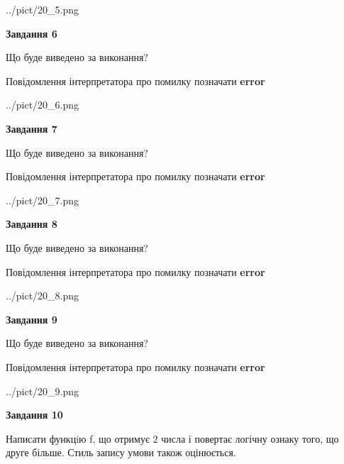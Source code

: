 \documentclass[12pt, ukrainian]{article}
\begin{document}
{\begin {large}
\begin{center}
	{../pict/20_5.png}
\end{center}
\newpage

{\begin {center}\textbf{Завдання 6}\end {center}}\par
Що буде виведено за виконання? \par
Повідомлення інтерпретатора про помилку позначати \textbf{error}

\begin{center}
	{../pict/20_6.png}
\end{center}
\newpage

{\begin {center}\textbf{Завдання 7}\end {center}}\par
Що буде виведено за виконання? \par
Повідомлення інтерпретатора про помилку позначати \textbf{error}

\begin{center}
	{../pict/20_7.png}
\end{center}
\newpage

{\begin {center}\textbf{Завдання 8}\end {center}}\par
Що буде виведено за виконання? \par
Повідомлення інтерпретатора про помилку позначати \textbf{error}

\begin{center}
	{../pict/20_8.png}
\end{center}
\newpage

{\begin {center}\textbf{Завдання 9}\end {center}}\par
Що буде виведено за виконання? \par
Повідомлення інтерпретатора про помилку позначати \textbf{error}

\begin{center}
	{../pict/20_9.png}
\end{center}
\newpage

{\begin {center}\textbf{Завдання 10}\end {center}}\par

Написати функцiю f, що отримує 2 числа і повертає логічну ознаку того, що друге більше. Стиль запису умови також оцінюється.\par
\newpage

\end {large}}
\end{document}
